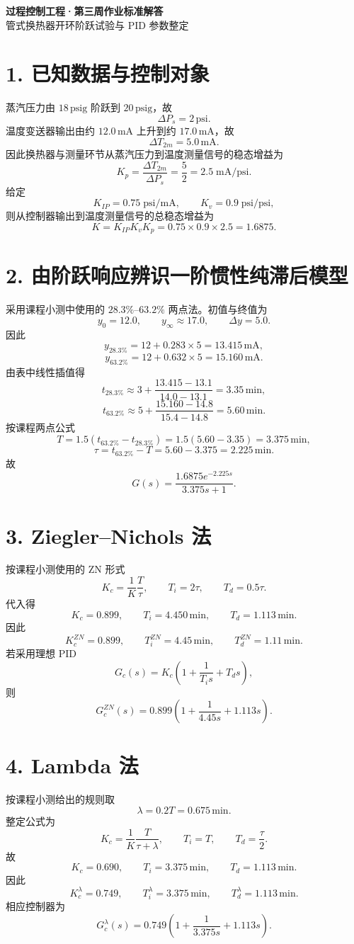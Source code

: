 \documentclass[UTF8,a4paper,11pt]{ctexart}
\begin{document}
\begin{center}
{\LARGE\bfseries 过程控制工程·第三周作业标准解答}\\[4pt]
{\large 管式换热器开环阶跃试验与 PID 参数整定}
\end{center}

\section*{1. 已知数据与控制对象}
蒸汽压力由 $18\,\mathrm{psig}$ 阶跃到 $20\,\mathrm{psig}$，故
\[
\Delta P_s=2\,\mathrm{psi}.
\]
温度变送器输出由约 $12.0\,\mathrm{mA}$ 上升到约 $17.0\,\mathrm{mA}$，故
\[
\Delta T_{2m}=5.0\,\mathrm{mA}.
\]
因此换热器与测量环节从蒸汽压力到温度测量信号的稳态增益为
\[
K_p=\frac{\Delta T_{2m}}{\Delta P_s}=\frac{5}{2}=2.5\;\mathrm{mA/psi}.
\]
给定
\[
K_{IP}=0.75\;\mathrm{psi/mA},\qquad K_v=0.9\;\mathrm{psi/psi},
\]
则从控制器输出到温度测量信号的总稳态增益为
\[
\boxed{K=K_{IP}K_vK_p=0.75\times0.9\times2.5=1.6875}.
\]

\section*{2. 由阶跃响应辨识一阶惯性纯滞后模型}
采用课程小测中使用的 $28.3\%$--$63.2\%$ 两点法。初值与终值为
\[
y_0=12.0,\qquad y_\infty\approx17.0,\qquad \Delta y=5.0.
\]
因此
\[
y_{28.3\%}=12+0.283\times5=13.415\,\mathrm{mA},
\]
\[
y_{63.2\%}=12+0.632\times5=15.160\,\mathrm{mA}.
\]
由表中线性插值得
\[
t_{28.3\%}\approx3+\frac{13.415-13.1}{14.0-13.1}=3.35\,\mathrm{min},
\]
\[
t_{63.2\%}\approx5+\frac{15.160-14.8}{15.4-14.8}=5.60\,\mathrm{min}.
\]
按课程两点公式
\[
T=1.5\left(t_{63.2\%}-t_{28.3\%}\right)
=1.5(5.60-3.35)=3.375\,\mathrm{min},
\]
\[
\tau=t_{63.2\%}-T=5.60-3.375=2.225\,\mathrm{min}.
\]
故
\[
\boxed{G(s)=\frac{1.6875e^{-2.225s}}{3.375s+1}}.
\]

\section*{3. Ziegler--Nichols 法}
按课程小测使用的 ZN 形式
\[
K_c=\frac{1}{K}\frac{T}{\tau},\qquad
T_i=2\tau,\qquad
T_d=0.5\tau.
\]
代入得
\[
K_c=0.899,\qquad
T_i=4.450\,\mathrm{min},\qquad
T_d=1.113\,\mathrm{min}.
\]
因此
\[
\boxed{K_c^{ZN}=0.899,\qquad T_i^{ZN}=4.45\,\mathrm{min},\qquad T_d^{ZN}=1.11\,\mathrm{min}}.
\]
若采用理想 PID
\[
G_c(s)=K_c\left(1+\frac{1}{T_i s}+T_d s\right),
\]
则
\[
\boxed{G_c^{ZN}(s)=0.899\left(1+\frac{1}{4.45s}+1.113s\right)}.
\]

\section*{4. Lambda 法}
按课程小测给出的规则取
\[
\lambda=0.2T=0.675\,\mathrm{min}.
\]
整定公式为
\[
K_c=\frac{1}{K}\frac{T}{\tau+\lambda},\qquad
T_i=T,\qquad
T_d=\frac{\tau}{2}.
\]
故
\[
K_c=0.690,\qquad
T_i=3.375\,\mathrm{min},\qquad
T_d=1.113\,\mathrm{min}.
\]
因此
\[
\boxed{K_c^{\lambda}=0.749,\qquad T_i^{\lambda}=3.375\,\mathrm{min},\qquad T_d^{\lambda}=1.113\,\mathrm{min}}.
\]
相应控制器为
\[
\boxed{G_c^{\lambda}(s)=0.749\left(1+\frac{1}{3.375s}+1.113s\right)}.
\]
\end{document}
